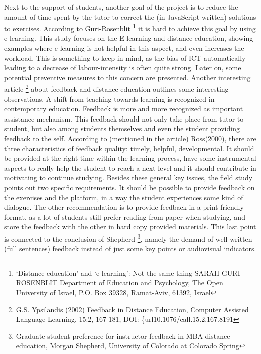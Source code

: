 \documentclass{article}
\begin{document}
Next to the support of students, another goal of the project is to reduce the 
amount of time spent by the tutor to correct the (in JavaScript written) 
solutions to exercises. According to Guri-Rosenblit
\footnote{‘Distance education’ and 
‘e-learning’: Not the same thing
SARAH GURI-ROSENBLIT
Department of Education and Psychology, The Open University of Israel, P.O. Box
39328, Ramat-Aviv, 61392, Israel} it is hard to achieve this goal by using 
e-learning. This study focuses on the E-learning and distance education, 
showing
examples where e-learning is not helpful in this aspect, and even 
increases the workload. This is something to keep in mind, as the bias of 
ICT automatically leading to a decrease of labour-intensity is often quite strong.
Later on, some potential preventive measures to this concern
are presented. \newline Another interesting article 
\footnote{G.S. Ypsilandis (2002) Feedback in Distance Education, Computer
Assisted Language Learning, 15:2, 167-181, DOI: 
\{url{10.1076/call.15.2.167.8191}} about feedback and distance education 
outlines some interesting observations. A shift from teaching towards learning
is recognized in contemporary education. Feedback is more and more 
recognized as important assistance mechanism. This feedback should not only
take place from tutor to student, but also among students themselves and even
the student providing feedback to the self. According to (mentioned in the
article) Ross(2000), there are three characteristics of feedback quality:
timely, helpful, developmental. It
should be provided at the right time within the learning process, have some 
instrumental aspects to really help the student to reach a next level and it 
should contribute in motivating to continue studying. Besides these general 
key issues, the field study points out two specific requirements. It should be
possible to provide feedback on the exercises and the platform, in a way the
student experiences some kind of dialogue. The other
recommendation is to provide feedback in a print friendly format, as a lot of 
students still prefer reading from paper when studying, and store
the feedback with the other
in hard copy provided materials. This last point is connected to the conclusion 
of Shepherd
\footnote{Graduate student preference for instructor feedback in MBA
distance education,
Morgan Shepherd,
University of Colorado at Colorado Spring}, namely the demand of well written
(full sentences) 
feedback instead of just some key points or audiovisual indicators.
\end{document}
